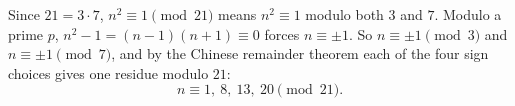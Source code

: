 Since $21=3\cdot7$, $n^2\equiv1\pmod{21}$ means $n^2\equiv1$ modulo both $3$ and $7$. Modulo a prime $p$, $n^2-1=(n-1)(n+1)\equiv0$ forces $n\equiv\pm1$. So $n\equiv\pm1\pmod3$ and $n\equiv\pm1\pmod7$, and by the Chinese remainder theorem each of the four sign choices gives one residue modulo $21$:
\[n\equiv\boxed{1,\ 8,\ 13,\ 20}\pmod{21}.\]
